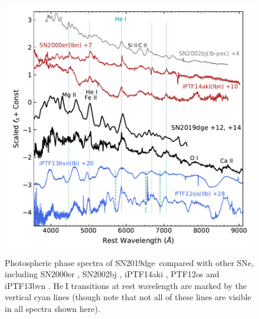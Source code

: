 \documentclass[twocolumn]{aastex63}
\newcommand{\name}{SN2019dge}
\def\ion#1#2{#1$\;${\footnotesize\rm{#2}}\relax}
\begin{document}
\begin{figure}[htbp!]
	\centering
	\includegraphics[width=\columnwidth]{figures/hst_opt.pdf}
	\caption{Photospheric phase spectra of \name\ compared with 
		other SNe, including SN2000er \citep{Pastorello2008}, SN2002bj \citep{Poznanski2010}, iPTF14aki 
		\citep{Hosseinzadeh2017}, PTF12os and iPTF13bvn \citep{Fremling2016}. \ion{He}{I} transitions at 
		rest wavelength are marked by the vertical cyan lines (though note that not all of these lines are 
		visible in all spectra shown here).
		\label{fig:hst_opt}}
\end{figure}
\end{document}
